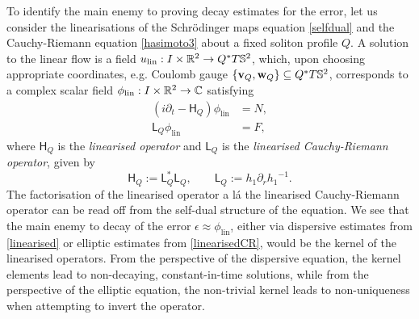 To identify the main enemy to proving decay estimates for the error, let us consider the linearisations of the Schr\"odinger maps equation \eqref{selfdual} and the Cauchy-Riemann equation \eqref{hasimoto3} about a fixed soliton profile $Q$. A solution to the linear flow is a field $u_{\mathrm{lin}} : I \times \mathbb R^2 \to Q^* T\mathbb S^2$, which, upon choosing appropriate coordinates, e.g. Coulomb gauge $\{\mathbf v_Q, \mathbf w_Q \} \subseteq Q^* T\mathbb S^2$, corresponds to a complex scalar field $\phi_{\mathrm{lin}} : I \times \mathbb R^2 \to \mathbb C$ satisfying 
    \begin{align}
        (i \partial_t - \mathsf{H}_Q) \phi_{\mathrm{lin}} \label{eq:linearised}
        &= N,\\
    \mathsf L_Q \phi_{\mathrm{lin}}
        &= F,\label{eq:linearisedCR}
    \end{align}
where $\mathsf H_Q$ is the \textit{linearised operator} and $\mathsf L_Q$ is the \textit{linearised Cauchy-Riemann operator}, given by 
\[
    \mathsf{H}_Q 
        := \mathsf{L}_Q^* \mathsf{L}_Q, 
        \qquad 
    \mathsf{L}_Q 
        := h_1 \partial_r {h_1}^{-1}.
\]
The factorisation of the linearised operator a l\'a the linearised Cauchy-Riemann operator can be read off from the self-dual structure of the equation. We see that the main enemy to decay of the error $\epsilon \approx \phi_{\mathrm{lin}}$, either via dispersive estimates from \eqref{linearised} or elliptic estimates from \eqref{linearisedCR}, would be the kernel of the linearised operators. From the perspective of the dispersive equation, the kernel elements lead to non-decaying, constant-in-time solutions, while from the perspective of the elliptic equation, the non-trivial kernel leads to non-uniqueness when attempting to invert the operator. 


